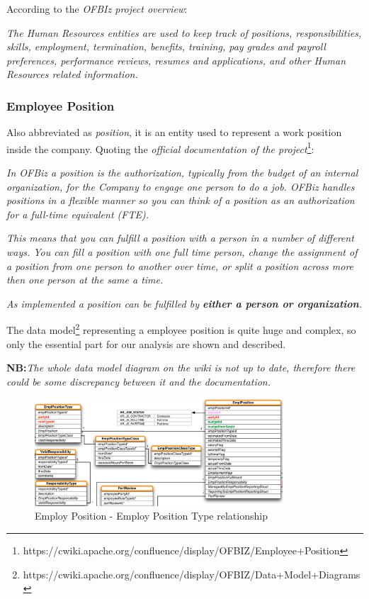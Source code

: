 According to the \textit{OFBIz project overview}:

\textit{The Human Resources entities are used to keep track of positions, responsibilities, skills, employment, termination, benefits, training, pay grades and payroll preferences, performance reviews, resumes and applications, and other Human Resources related information.}

\subsubsection{Employee Position}

Also abbreviated as \textit{position}, it is an entity used to represent a work position inside the company.
Quoting the \textit{official documentation of the project}\footnote{https://cwiki.apache.org/confluence/display/OFBIZ/Employee+Position}:

\textit{In OFBiz a position is the authorization, typically from the budget of an internal organization, for the Company to engage one person to do a job. OFBiz handles positions in a flexible manner so you can think of a position as an authorization for a full-time equivalent (FTE).}

\textit{This means that you can fulfill a position with a person in a number of different ways. You can fill a position with one full time person, change the assignment of a position from one person to another over time, or split a position across more then one person at the same a time.}

\textit{As implemented a position can be fulfilled by \textbf{either a person or organization}.}

The data model\footnote{https://cwiki.apache.org/confluence/display/OFBIZ/Data+Model+Diagrams} representing a employee position is quite huge and complex, so only the essential part for our analysis are shown and described.

\textbf{NB:}\textit{The whole data model diagram on the wiki is not up to date, therefore there could be some discrepancy between it and the documentation.}

\begin{figure}[H]
	\centerline{
		\includegraphics[width=350px]{../Datas/images/emplPos-posType.pdf}
	}
	\label{fig:emplPos-type}
	\caption{Employ Position - Employ Position Type relationship}
\end{figure}


